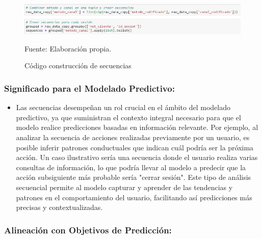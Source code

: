 \begin{figure}[H]
    \begin{minipage}[t]{0.9\textwidth}
        \caption{Código construcción de secuencias}
        \label{construcción_secuencias}        
    \end{minipage}

    \vspace{10pt}

    \begin{minipage}[b]{1\textwidth}
        \centering
        \includegraphics[width=\textwidth]{img/Código construcción de secuencias.jpg}        
    \end{minipage}

    \begin{minipage}[t]{0.9\textwidth}
        Fuente: Elaboración propia.
    \end{minipage}
\end{figure}

\subsubsection{Significado para el Modelado Predictivo:}

\begin{itemize}
    \item Las secuencias desempeñan un rol crucial en el ámbito del modelado predictivo, ya que suministran el contexto integral necesario para que el modelo realice predicciones basadas en información relevante. Por ejemplo, al analizar la secuencia de acciones realizadas previamente por un usuario, es posible inferir patrones conductuales que indican cuál podría ser la próxima acción. Un caso ilustrativo sería una secuencia donde el usuario realiza varias consultas de información, lo que podría llevar al modelo a predecir que la acción subsiguiente más probable sería "cerrar sesión". Este tipo de análisis secuencial permite al modelo capturar y aprender de las tendencias y patrones en el comportamiento del usuario, facilitando así predicciones más precisas y contextualizadas.
\end{itemize}

\subsubsection{Alineación con Objetivos de Predicción:}

